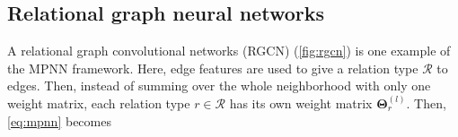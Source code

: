 % 
% 
% 
% 
% 
% 
% 


\subsection{Relational graph neural networks}


A relational graph convolutional networks (RGCN) (\cref{fig:rgcn}) is one 
example of the MPNN framework. Here, edge features are used to 
give a relation type $\mathcal{R}$ to edges. Then, instead of summing over 
the whole neighborhood with only one weight matrix, each relation type 
$r \in \mathcal{R}$ has its own weight matrix $\pmb{\Theta}^{(l)}_r$. 
Then, \cref{eq:mpnn} becomes\cite{schlichtkrull2018modeling}


